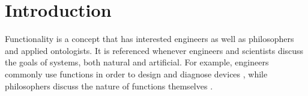 \documentclass[sw]{iosart2x}
\begin{document}

\section{Introduction}\label{sec:intro}

Functionality is a concept that has interested engineers as well as philosophers and applied ontologists. 
It is referenced whenever engineers and scientists discuss the goals of systems, both natural and artificial. 
For example, engineers commonly use functions in order to design \cite{pahl_engineering_2007} and diagnose devices \cite{larssonDiagnosisBasedExplicit1996}, while philosophers discuss the nature of functions themselves \cite{cumminsFunctionalAnalysis1975}.
\end{document}

